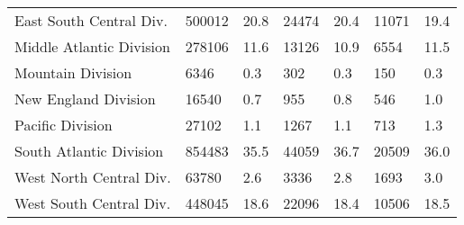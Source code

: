 \begin{longtable}{lllllll}
East South Central Div. & 500012 & 20.8 & 24474 & 20.4 & 11071 & 19.4 \\ 
Middle Atlantic Division & 278106 & 11.6 & 13126 & 10.9 & 6554 & 11.5 \\ 
Mountain Division & 6346 & 0.3 & 302 & 0.3 & 150 & 0.3 \\ 
New England Division & 16540 & 0.7 & 955 & 0.8 & 546 & 1.0 \\ 
Pacific Division & 27102 & 1.1 & 1267 & 1.1 & 713 & 1.3 \\ 
South Atlantic Division & 854483 & 35.5 & 44059 & 36.7 & 20509 & 36.0 \\ 
West North Central Div. & 63780 & 2.6 & 3336 & 2.8 & 1693 & 3.0 \\ 
West South Central Div. & 448045 & 18.6 & 22096 & 18.4 & 10506 & 18.5 \\ 
 \bottomrule
\end{longtable}

